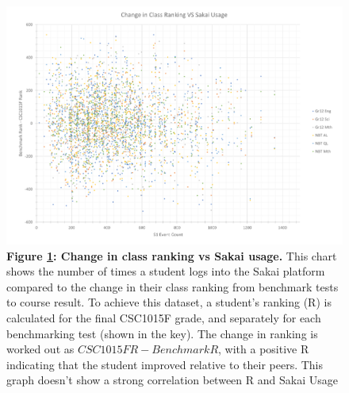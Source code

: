 \begin{figure}[H]
    \centering
    \begin{mdframed}
        \centering
        \includegraphics[scale=0.55]{./resources/figures/run3-chart2.png}
    \end{mdframed}
    \caption[Change in class ranking vs Sakai usage]{\textbf{Figure \ref{run3-chart2}: Change in class ranking vs Sakai usage.} This chart shows the number of times a student logs into the Sakai platform compared to the change in their class ranking from benchmark tests to course result. To achieve this dataset, a student's ranking (R) is calculated for the final CSC1015F grade, and separately for each benchmarking test (shown in the key). The change in ranking is worked out as $CSC1015F R - Benchmark R $, with a positive R indicating that the student improved relative to their peers. This graph doesn't show a strong correlation between R and Sakai Usage}
    \label{run3-chart2}
\end{figure}